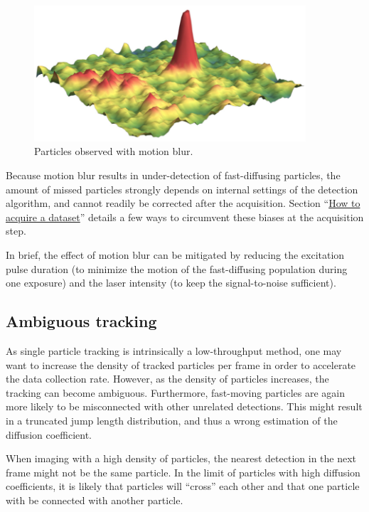 \begin{figure}[h]
\centering
\includegraphics[width=0.9\textwidth]{../SPTGUI/static/SPTGUI/img/motionblur.png}
\caption{\label{fig:fig2}Particles observed with motion blur.}
\end{figure}

Because motion blur results in under-detection of fast-diffusing particles, the amount of missed particles strongly depends on internal settings of the detection algorithm, and cannot readily be corrected after the acquisition. Section ``\href{https://spoton.berkeley.edu/SPTGUI/docs/latest#how-to-acquire-a-good-dataset-}{How to acquire a dataset}'' details a few ways to circumvent these biases at the acquisition step.

In brief, the effect of motion blur can be mitigated by reducing the excitation pulse duration (to minimize the motion of the fast-diffusing population during one exposure) and the laser intensity (to keep the signal-to-noise sufficient).

\subsection{Ambiguous tracking}

As single particle tracking is intrinsically a low-throughput method, one may want to increase the density of tracked particles per frame in order to accelerate the data collection rate. However, as the density of particles increases, the tracking can become ambiguous. Furthermore, fast-moving particles are again more likely to be misconnected with other unrelated detections. This might result in a truncated jump length distribution, and thus a wrong estimation of the diffusion coefficient.

When imaging with a high density of particles, the nearest detection in the next frame might not be the same particle. In the limit of particles with high diffusion coefficients, it is likely that particles will ``cross'' each other and that one particle with be connected with another particle.


